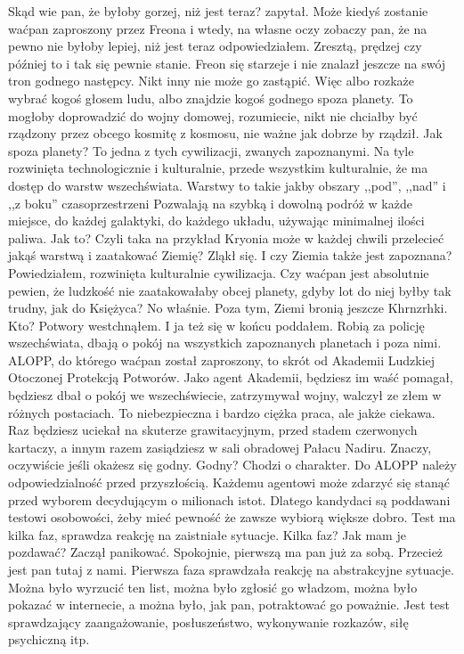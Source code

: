 \begin{dialogue}
\ds{} Skąd wie pan, że byłoby gorzej, niż jest teraz? \dm{} zapytał.
\ds{} Może kiedyś zostanie waćpan zaproszony przez Freona i wtedy, na własne oczy zobaczy pan, że na pewno nie byłoby lepiej, niż jest teraz \dm{} odpowiedziałem. \dm{}
Zresztą, prędzej czy później to i tak się pewnie stanie. Freon się starzeje i nie znalazł jeszcze na swój tron godnego następcy. Nikt inny nie może go zastąpić.
Więc albo rozkaże wybrać kogoś głosem ludu, albo znajdzie kogoś godnego spoza planety. To mogłoby doprowadzić do wojny domowej, 
rozumiecie, nikt nie chciałby być rządzony przez obcego kosmitę z kosmosu, nie ważne jak dobrze by rządził.
\ds{} Jak spoza planety? 
\ds{} To jedna z tych cywilizacji, zwanych zapoznanymi. Na tyle rozwinięta technologicznie i kulturalnie, przede wszystkim kulturalnie, 
że ma dostęp do warstw wszechświata. Warstwy to takie jakby obszary ,,pod'', ,,nad'' i ,,z boku'' czasoprzestrzeni
Pozwalają na szybką i dowolną podróż w każde miejsce, do każdej galaktyki, do każdego układu, używając minimalnej ilości paliwa.
\ds{} Jak to? Czyli taka na przykład Kryonia może w każdej chwili przelecieć jakąś warstwą i zaatakować Ziemię? 
\dm{} Zląkł się. \dm{} I czy Ziemia także jest zapoznana?
\ds{} Powiedziałem, rozwinięta kulturalnie cywilizacja. Czy waćpan jest absolutnie pewien, że ludzkość nie zaatakowałaby obcej planety, gdyby lot do niej byłby tak trudny, jak do Księżyca?
No właśnie. Poza tym, Ziemi bronią jeszcze Khrnzrhki.
\ds{} Kto? 
\ds{} Potwory \dm{} westchnąłem. I ja też się w końcu poddałem. \dm{} Robią za policję wszechświata, dbają o pokój na wszystkich zapoznanych planetach i poza nimi. 
ALOPP, do którego waćpan został zaproszony, to skrót od Akademii Ludzkiej Otoczonej Protekcją Potworów. 
Jako agent Akademii, będziesz im waść pomagał, będziesz dbał o pokój we wszechświecie, zatrzymywał wojny, walczył ze złem w różnych postaciach. 
To niebezpieczna i bardzo ciężka praca, ale jakże ciekawa.
Raz będziesz uciekał na skuterze grawitacyjnym, przed stadem czerwonych kartaczy, a innym razem zasiądziesz w sali obradowej Pałacu Nadiru. 
Znaczy, oczywiście jeśli okażesz się godny.
\ds{} Godny?
\ds{} Chodzi o charakter. Do ALOPP należy odpowiedzialność przed przyszłością. 
Każdemu agentowi może zdarzyć się stanąć przed wyborem decydującym o milionach istot. 
Dlatego kandydaci są poddawani testowi osobowości, żeby mieć pewność że zawsze wybiorą większe dobro. 
Test ma kilka faz, sprawdza reakcję na zaistniałe sytuacje.
\ds{} Kilka faz? Jak mam je pozdawać? \dm{} Zaczął panikować.
\ds{} Spokojnie, pierwszą ma pan już za sobą. Przecież jest pan tutaj z nami. 
Pierwsza faza sprawdzała reakcję na abstrakcyjne sytuacje.
Można było wyrzucić ten list, można było zgłosić go władzom, można było pokazać w internecie, a można było, jak pan, potraktować go poważnie.
Jest test sprawdzający zaangażowanie, posłuszeństwo, wykonywanie rozkazów, siłę psychiczną itp.
\end{dialogue}


